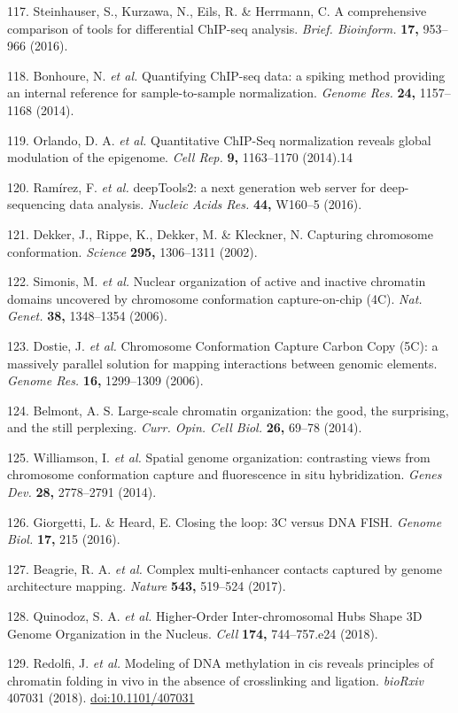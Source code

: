 \documentclass[11pt,twoside]{MPIthesis}
\theoremstyle{definition}
\theoremstyle{definition}
\theoremstyle{definition}
\theoremstyle{remark}
\begin{document}
117. Steinhauser, S., Kurzawa, N., Eils, R. \& Herrmann, C. A
comprehensive comparison of tools for differential ChIP-seq analysis.
\emph{Brief. Bioinform.} \textbf{17,} 953--966 (2016).

118. Bonhoure, N. \emph{et al.} Quantifying ChIP-seq data: a spiking
method providing an internal reference for sample-to-sample
normalization. \emph{Genome Res.} \textbf{24,} 1157--1168 (2014).

119. Orlando, D. A. \emph{et al.} Quantitative ChIP-Seq normalization
reveals global modulation of the epigenome. \emph{Cell Rep.} \textbf{9,}
1163--1170 (2014).14

120. Ramírez, F. \emph{et al.} deepTools2: a next generation web server
for deep-sequencing data analysis. \emph{Nucleic Acids Res.}
\textbf{44,} W160--5 (2016).

121. Dekker, J., Rippe, K., Dekker, M. \& Kleckner, N. Capturing
chromosome conformation. \emph{Science} \textbf{295,} 1306--1311 (2002).

122. Simonis, M. \emph{et al.} Nuclear organization of active and
inactive chromatin domains uncovered by chromosome conformation
capture-on-chip (4C). \emph{Nat. Genet.} \textbf{38,} 1348--1354 (2006).

123. Dostie, J. \emph{et al.} Chromosome Conformation Capture Carbon
Copy (5C): a massively parallel solution for mapping interactions
between genomic elements. \emph{Genome Res.} \textbf{16,} 1299--1309
(2006).

124. Belmont, A. S. Large-scale chromatin organization: the good, the
surprising, and the still perplexing. \emph{Curr. Opin. Cell Biol.}
\textbf{26,} 69--78 (2014).

125. Williamson, I. \emph{et al.} Spatial genome organization:
contrasting views from chromosome conformation capture and fluorescence
in situ hybridization. \emph{Genes Dev.} \textbf{28,} 2778--2791 (2014).

126. Giorgetti, L. \& Heard, E. Closing the loop: 3C versus DNA FISH.
\emph{Genome Biol.} \textbf{17,} 215 (2016).

127. Beagrie, R. A. \emph{et al.} Complex multi-enhancer contacts
captured by genome architecture mapping. \emph{Nature} \textbf{543,}
519--524 (2017).

128. Quinodoz, S. A. \emph{et al.} Higher-Order Inter-chromosomal Hubs
Shape 3D Genome Organization in the Nucleus. \emph{Cell} \textbf{174,}
744--757.e24 (2018).

129. Redolfi, J. \emph{et al.} Modeling of DNA methylation in cis
reveals principles of chromatin folding in vivo in the absence of
crosslinking and ligation. \emph{bioRxiv} 407031 (2018).
\url{doi:10.1101/407031}
\end{document}
